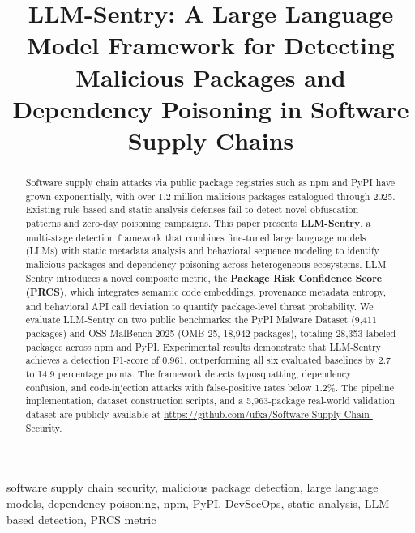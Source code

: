 \documentclass[conference]{IEEEtran}
\begin{document}
\title{LLM-Sentry: A Large Language Model Framework for Detecting Malicious Packages and Dependency Poisoning in Software Supply Chains}

\author{
}

\maketitle

\begin{abstract}
Software supply chain attacks via public package registries such as npm and PyPI have grown exponentially, with over 1.2 million malicious packages catalogued through 2025. Existing rule-based and static-analysis defenses fail to detect novel obfuscation patterns and zero-day poisoning campaigns. This paper presents \textbf{LLM-Sentry}, a multi-stage detection framework that combines fine-tuned large language models (LLMs) with static metadata analysis and behavioral sequence modeling to identify malicious packages and dependency poisoning across heterogeneous ecosystems. LLM-Sentry introduces a novel composite metric, the \textbf{Package Risk Confidence Score (PRCS)}, which integrates semantic code embeddings, provenance metadata entropy, and behavioral API call deviation to quantify package-level threat probability. We evaluate LLM-Sentry on two public benchmarks: the PyPI Malware Dataset (9,411 packages) and OSS-MalBench-2025 (OMB-25, 18,942 packages), totaling 28,353 labeled packages across npm and PyPI. Experimental results demonstrate that LLM-Sentry achieves a detection F1-score of 0.961, outperforming all six evaluated baselines by 2.7 to 14.9 percentage points. The framework detects typosquatting, dependency confusion, and code-injection attacks with false-positive rates below 1.2\%. The pipeline implementation, dataset construction scripts, and a 5,963-package real-world validation dataset are publicly available at \url{https://github.com/ufxa/Software-Supply-Chain-Security}.
\end{abstract}

\begin{IEEEkeywords}
software supply chain security, malicious package detection, large language models, dependency poisoning, npm, PyPI, DevSecOps, static analysis, LLM-based detection, PRCS metric
\end{IEEEkeywords}
\end{document}

